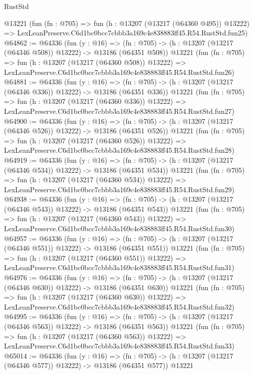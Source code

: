 \begin{lexlean}{RustStd}
\begin{coremodule}
    @13221
    (fun (fn : @705) =>
    fun (h : @13207 (@13217 (@64360 @495)) @13222) =>
    LexLeanPreserve.C6d1bc0bcc7cbbb3a169c4e838883ff45.R54.RustStd.fun25)
@64862 := @64336
    (fun (y : @16) =>
    (fn : @705) -> (h : @13207 (@13217 (@64346 @508)) @13222) -> @13186 (@64351 @508))
    @13221
    (fun (fn : @705) =>
    fun (h : @13207 (@13217 (@64360 @508)) @13222) =>
    LexLeanPreserve.C6d1bc0bcc7cbbb3a169c4e838883ff45.R54.RustStd.fun26)
@64881 := @64336
    (fun (y : @16) =>
    (fn : @705) -> (h : @13207 (@13217 (@64346 @336)) @13222) -> @13186 (@64351 @336))
    @13221
    (fun (fn : @705) =>
    fun (h : @13207 (@13217 (@64360 @336)) @13222) =>
    LexLeanPreserve.C6d1bc0bcc7cbbb3a169c4e838883ff45.R54.RustStd.fun27)
@64900 := @64336
    (fun (y : @16) =>
    (fn : @705) -> (h : @13207 (@13217 (@64346 @526)) @13222) -> @13186 (@64351 @526))
    @13221
    (fun (fn : @705) =>
    fun (h : @13207 (@13217 (@64360 @526)) @13222) =>
    LexLeanPreserve.C6d1bc0bcc7cbbb3a169c4e838883ff45.R54.RustStd.fun28)
@64919 := @64336
    (fun (y : @16) =>
    (fn : @705) -> (h : @13207 (@13217 (@64346 @534)) @13222) -> @13186 (@64351 @534))
    @13221
    (fun (fn : @705) =>
    fun (h : @13207 (@13217 (@64360 @534)) @13222) =>
    LexLeanPreserve.C6d1bc0bcc7cbbb3a169c4e838883ff45.R54.RustStd.fun29)
@64938 := @64336
    (fun (y : @16) =>
    (fn : @705) -> (h : @13207 (@13217 (@64346 @543)) @13222) -> @13186 (@64351 @543))
    @13221
    (fun (fn : @705) =>
    fun (h : @13207 (@13217 (@64360 @543)) @13222) =>
    LexLeanPreserve.C6d1bc0bcc7cbbb3a169c4e838883ff45.R54.RustStd.fun30)
@64957 := @64336
    (fun (y : @16) =>
    (fn : @705) -> (h : @13207 (@13217 (@64346 @551)) @13222) -> @13186 (@64351 @551))
    @13221
    (fun (fn : @705) =>
    fun (h : @13207 (@13217 (@64360 @551)) @13222) =>
    LexLeanPreserve.C6d1bc0bcc7cbbb3a169c4e838883ff45.R54.RustStd.fun31)
@64976 := @64336
    (fun (y : @16) =>
    (fn : @705) -> (h : @13207 (@13217 (@64346 @630)) @13222) -> @13186 (@64351 @630))
    @13221
    (fun (fn : @705) =>
    fun (h : @13207 (@13217 (@64360 @630)) @13222) =>
    LexLeanPreserve.C6d1bc0bcc7cbbb3a169c4e838883ff45.R54.RustStd.fun32)
@64995 := @64336
    (fun (y : @16) =>
    (fn : @705) -> (h : @13207 (@13217 (@64346 @563)) @13222) -> @13186 (@64351 @563))
    @13221
    (fun (fn : @705) =>
    fun (h : @13207 (@13217 (@64360 @563)) @13222) =>
    LexLeanPreserve.C6d1bc0bcc7cbbb3a169c4e838883ff45.R54.RustStd.fun33)
@65014 := @64336
    (fun (y : @16) =>
    (fn : @705) -> (h : @13207 (@13217 (@64346 @577)) @13222) -> @13186 (@64351 @577))
    @13221

\end{coremodule}
\end{lexlean}
